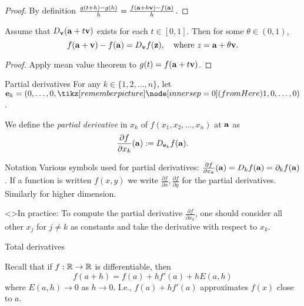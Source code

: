 
\begin{proof}
    By definition \(\frac{g(t+h)-g(h)}{h} =\frac{f(\aa+h \vv) - f(\aa)}{h} \).
\end{proof}

\begin{theorem}
    Assume that \(D_{\vv}(\aa+t\vv)\)  exists for each \(t\in [0,1]\). Then for some \(\theta \in (0,1)\),
    \[
        f(\aa+\vv) - f(\aa) = D_{\vv}f (\zz),
        \quad
        \text{where \(z=\aa + \theta \vv\)}.
    \]
\end{theorem}

\begin{proof}
    Apply mean value theorem to \(g(t) = f(\aa+t\vv)\).
\end{proof}




{Partial derivatives}
For any \(k\in\{1,2,\ldots,n\}\),
let
\( \ee_k=(0,\ldots,0,\here{1}{fromHere},0,\ldots,0)  \).

\begin{definition}
    We define the \emph{partial derivative} in \(x_k\) of \(f(x_1,x_2,\ldots,x_n)\) at \(\aa\) as
    \[
        \frac{\partial f}{\partial x_k}(\aa) := D_{\ee_k}f(\aa).
    \]
\end{definition}


{Notation}
Various symbols used for partial derivatives:
\(\frac{\partial f}{\partial x_k}(\aa) = D_kf(\aa) = \partial_{k}f(\aa)\).
If  a function is written \(f(x,y)\) we write \(\frac{\partial f}{\partial x}, \frac{\partial f}{\partial y}\) for the partial derivatives. Similarly for higher dimension.


    <>{In practice:}
To compute the partial derivative \( \frac{\partial f}{\partial x_k}\), one should consider all other \(x_j\) for \(j\neq k\) as constants and take the derivative with respect to \(x_k\).




    {Total derivatives}


Recall that if \(f:\bR \to \bR\) is differentiable, then
\[
    f(a + h) = f(a) + h f'(a) + hE(a,h)
\]
where \(E(a,h) \to 0\) as \(h\to 0\).
I.e., \(f(a) + hf'(a)\) approximates \(f(x)\) close to \(a\).


